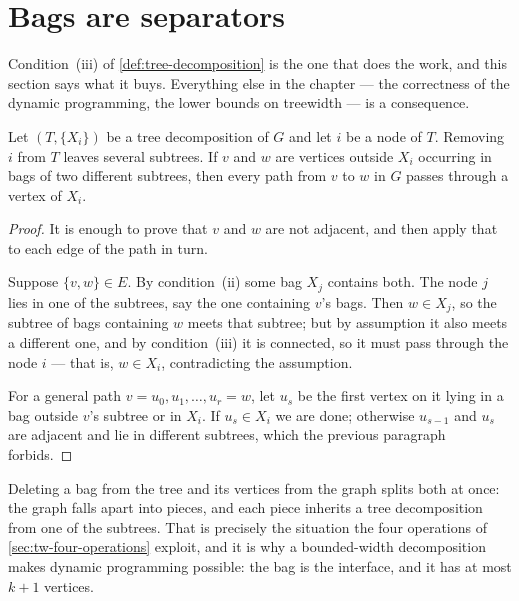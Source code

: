 \section{Bags are separators}
\label{sec:bags-separators}

Condition~(iii) of \cref{def:tree-decomposition} is the one that does the work,
and this section says what it buys. Everything else in the chapter --- the
correctness of the dynamic programming, the lower bounds on treewidth --- is a
consequence.

\begin{lemma}\label{lem:tw-separator}
Let $(T, \{X_i\})$ be a tree decomposition of $G$ and let $i$ be a node of $T$.
Removing $i$ from $T$ leaves several subtrees. If $v$ and $w$ are vertices
outside $X_i$ occurring in bags of two different subtrees, then every path from
$v$ to $w$ in $G$ passes through a vertex of $X_i$.
\end{lemma}

\begin{proof}
It is enough to prove that $v$ and $w$ are not adjacent, and then apply that to
each edge of the path in turn.

Suppose $\{v,w\} \in E$. By condition~(ii) some bag $X_j$ contains both. The
node $j$ lies in one of the subtrees, say the one containing $v$'s bags. Then
$w \in X_j$, so the subtree of bags containing $w$ meets that subtree; but by
assumption it also meets a different one, and by condition~(iii) it is
connected, so it must pass through the node $i$ --- that is, $w \in X_i$,
contradicting the assumption.

For a general path $v = u_0, u_1, \ldots, u_r = w$, let $u_s$ be the first
vertex on it lying in a bag outside $v$'s subtree or in $X_i$. If $u_s \in X_i$
we are done; otherwise $u_{s-1}$ and $u_s$ are adjacent and lie in different
subtrees, which the previous paragraph forbids.
\end{proof}

\begin{intuition}
Deleting a bag from the tree and its vertices from the graph splits both at
once: the graph falls apart into pieces, and each piece inherits a tree
decomposition from one of the subtrees. That is precisely the situation the
four operations of \cref{sec:tw-four-operations} exploit, and it is why a
bounded-width decomposition makes dynamic programming possible: the bag is the
interface, and it has at most $k+1$ vertices.
\end{intuition}

